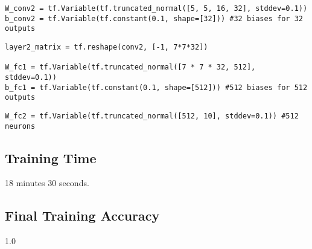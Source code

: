 \documentclass[a4paper]{article}
\begin{document}
\begin{lstlisting}[frame=single]
W_conv2 = tf.Variable(tf.truncated_normal([5, 5, 16, 32], stddev=0.1))
b_conv2 = tf.Variable(tf.constant(0.1, shape=[32])) #32 biases for 32 outputs
\end{lstlisting}

\begin{lstlisting}[frame=single]
layer2_matrix = tf.reshape(conv2, [-1, 7*7*32])

W_fc1 = tf.Variable(tf.truncated_normal([7 * 7 * 32, 512], stddev=0.1))
b_fc1 = tf.Variable(tf.constant(0.1, shape=[512])) #512 biases for 512 outputs

\end{lstlisting}

\begin{lstlisting}[frame=single]
W_fc2 = tf.Variable(tf.truncated_normal([512, 10], stddev=0.1)) #512 neurons
\end{lstlisting}


\subsection{Training Time}
18 minutes 30 seconds.

\subsection{Final Training Accuracy}
1.0
\end{document}
